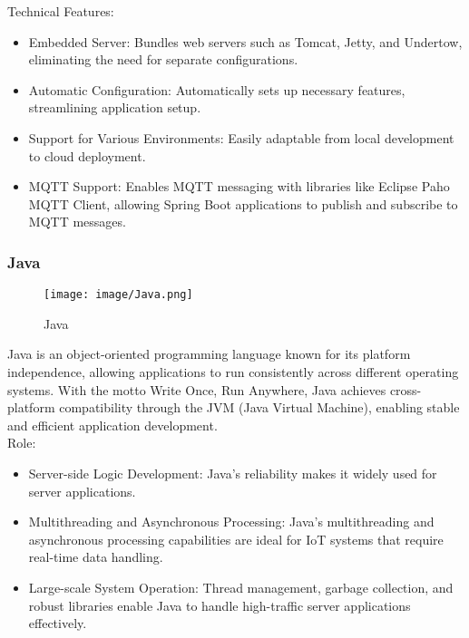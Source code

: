 \documentclass[conference]{IEEEtran}
\begin{document}
Technical Features: 
\begin{itemize}
    \item Embedded Server: Bundles web servers such as Tomcat, Jetty, and Undertow, eliminating the need for separate configurations.\\
    \item Automatic Configuration: Automatically sets up necessary features, streamlining application setup.\\
    \item Support for Various Environments: Easily adaptable from local development to cloud deployment.\\
    \item MQTT Support: Enables MQTT messaging with libraries like Eclipse Paho MQTT Client, allowing Spring Boot applications to publish and subscribe to MQTT messages.\\
\end{itemize}



\subsubsection{Java}

\begin{figure}[h!]
    \centering
    \texttt{[image: image/Java.png]}
    \caption{Java}
    \label{fig:enter-label}
\end{figure}

\noindent Java is an object-oriented programming language known for its platform independence, allowing applications to run consistently across different operating systems. With the motto Write Once, Run Anywhere, Java achieves cross-platform compatibility through the JVM (Java Virtual Machine), enabling stable and efficient application development. \\

Role:
\begin{itemize}
    \item Server-side Logic Development: Java’s reliability makes it widely used for server applications.\\ 
    \item Multithreading and Asynchronous Processing: Java's multithreading and asynchronous processing capabilities are ideal for IoT systems that require real-time data handling.\\
    \item Large-scale System Operation: Thread management, garbage collection, and robust libraries enable Java to handle high-traffic server applications effectively.\\
\end{itemize}
\end{document}
